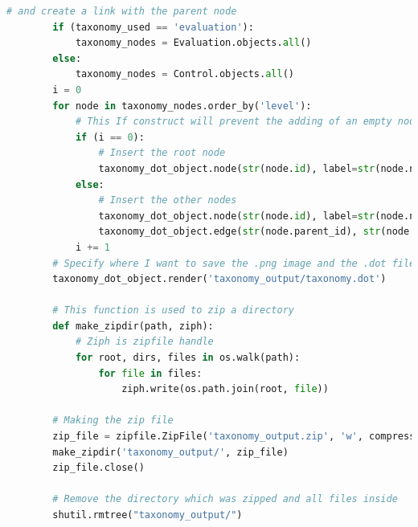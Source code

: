 \begin{itemize}
\begin{lstlisting}[language=Python, label=lst:view_DOT_eval, caption={Codice utilizzato per la realizzazione del
        file .dot e relativa immagine .png.}]
        # and create a link with the parent node
        if (taxonomy_used == 'evaluation'):
            taxonomy_nodes = Evaluation.objects.all()
        else:
            taxonomy_nodes = Control.objects.all()
        i = 0
        for node in taxonomy_nodes.order_by('level'):
            # This If construct will prevent the adding of an empty node to the root node in the graph
            if (i == 0):
                # Insert the root node
                taxonomy_dot_object.node(str(node.id), label=str(node.name))
            else:
                # Insert the other nodes
                taxonomy_dot_object.node(str(node.id), label=str(node.name))
                taxonomy_dot_object.edge(str(node.parent_id), str(node.id))
            i += 1
        # Specify where I want to save the .png image and the .dot file
        taxonomy_dot_object.render('taxonomy_output/taxonomy.dot')

        # This function is used to zip a directory
        def make_zipdir(path, ziph):
            # Ziph is zipfile handle
            for root, dirs, files in os.walk(path):
                for file in files:
                    ziph.write(os.path.join(root, file))

        # Making the zip file
        zip_file = zipfile.ZipFile('taxonomy_output.zip', 'w', compression=zipfile.ZIP_DEFLATED)
        make_zipdir('taxonomy_output/', zip_file)
        zip_file.close()

        # Remove the directory which was zipped and all files inside
        shutil.rmtree("taxonomy_output/")


\end{lstlisting}
\end{itemize}
